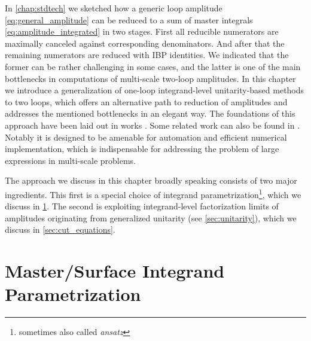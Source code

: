 In \cref{chap:stdtech} we sketched how a generic loop amplitude \eqref{eq:general_amplitude} can be reduced
to a sum of master integrals \eqref{eq:amplitude_integrated} in two stages.
First all reducible numerators are maximally canceled against corresponding denominators.
And after that the remaining numerators are reduced with IBP identities.
We indicated that the former can be rather challenging in some cases,
and the latter is one of the main bottlenecks in computations of
multi-scale two-loop amplitudes.
In this chapter we introduce a generalization of one-loop integrand-level unitarity-based methods \cite{Ossola:2006us,Giele:2008ve,Ellis:2008ir}
to two loops, which offers an alternative path to reduction of amplitudes and addresses the mentioned bottlenecks in an elegant way.
The foundations of this approach have been laid out in works \cite{Ita:2015tya,Abreu:2017xsl,Abreu:2017hqn,Abreu:2017idw}.
Some related work can also be found in 
\cite{Mastrolia:2011pr,Badger:2012dp,Badger:2013gxa,Zhang:2012ce,Mastrolia:2013kca,Mastrolia:2016dhn,Mastrolia:2012an,Kleiss:2012yv,Feng:2012bm,Kosower:2011ty}.
Notably it is designed to be amenable for automation and efficient numerical implementation, which is indispensable
for addressing the problem of large expressions in multi-scale problems.

The approach we discuss in this chapter broadly speaking consists of two major ingredients.
This first is a special choice of integrand parametrization\footnote{sometimes also called \emph{ansatz}},
which we discuss in \cref{sec:ansatz_integrand}.
The second is exploiting integrand-level factorization limits of amplitudes originating from generalized unitarity (see \cref{sec:unitarity}),
which we discuss in \cref{sec:cut_equations}.





\section{Master/Surface Integrand Parametrization}
\label{sec:ansatz_integrand}

